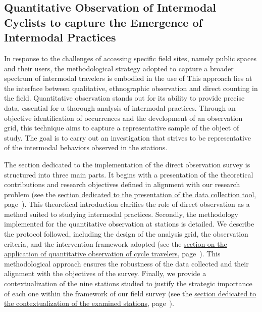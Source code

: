 \begin{refsegment}
\newpage
{} %
\section{Quantitative Observation of Intermodal Cyclists to capture the Emergence of Intermodal Practices
    \label{chap3:observation-quantitative}
    }

In response to the challenges of accessing specific field sites, namely public spaces and their users, the methodological strategy adopted to capture a broader spectrum of intermodal travelers is embodied in the use of  This approach lies at the interface between qualitative, ethnographic observation and direct counting in the field. Quantitative observation stands out for its ability to provide precise data, essential for a thorough analysis of intermodal practices. Through an objective identification of occurrences and the development of an observation grid, this technique aims to capture a representative sample of the object of study. The goal is to carry out an investigation that strives to be representative of the intermodal behaviors observed in the stations.%

The section dedicated to the implementation of the direct observation survey is structured into three main parts. It begins with a presentation of the theoretical contributions and research objectives defined in alignment with our research problem (see the \hyperref[chap3:observation-quantitative-outil-adapte]{section dedicated to the presentation of the data collection tool}, page~\pageref{chap3:observation-quantitative-outil-adapte}). This theoretical introduction clarifies the role of direct observation as a method suited to studying intermodal practices. Secondly, the methodology implemented for the quantitative observation at stations is detailed. We describe the protocol followed, including the design of the analysis grid, the observation criteria, and the intervention framework adopted (see the \hyperref[chap3:methodologie-observation-quantitative]{section on the application of quantitative observation of cycle travelers}, page~\pageref{chap3:methodologie-observation-quantitative}). This methodological approach ensures the robustness of the data collected and their alignment with the objectives of the survey. Finally, we provide a contextualization of the nine stations studied to justify the strategic importance of each one within the framework of our field survey (see the \hyperref[chap3:observation-quantitative-gares-examinees]{section dedicated to the contextualization of the examined stations}, page~\pageref{chap3:observation-quantitative-gares-examinees}).%


\end{refsegment}
